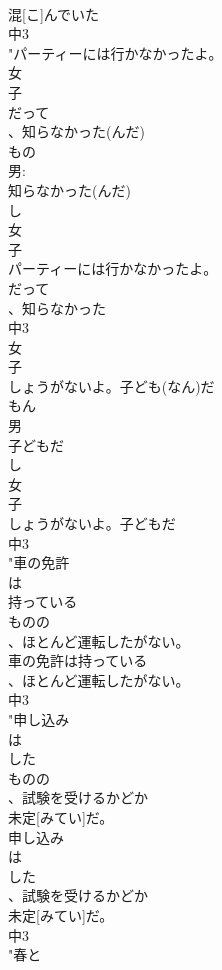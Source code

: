 \documentclass[8pt]{extreport}
\begin{document}
\begin{CJK}{UTF8}{min}
\\	混[こ]んでいた
\\	中3
\\	"パーティーには行かなかったよ。
\\	女 
\\	子 
\\	だって
\\	、知らなかった(んだ)
\\	もの
\\	男:
\\	知らなかった(んだ)
\\	し
\\	女 
\\	子
\\	パーティーには行かなかったよ。
\\	だって
\\	、知らなかった
\\	中3
\\	女 
\\	子 
\\	しょうがないよ。子ども(なん)だ
\\	もん
\\	男 
\\	子どもだ
\\	し
\\	女 
\\	子
\\	しょうがないよ。子どもだ
\\	中3
\\	"車の免許
\\	は
\\	持っている
\\	ものの
\\	、ほとんど運転したがない。
\\	車の免許は持っている
\\	、ほとんど運転したがない。
\\	中3
\\	"申し込み
\\	は
\\	した
\\	ものの
\\	、試験を受けるかどか
\\	未定[みてい]だ。
\\	申し込み
\\	は
\\	した
\\	、試験を受けるかどか
\\	未定[みてい]だ。
\\	中3
\\	"春と

\end{CJK}
\end{document}
